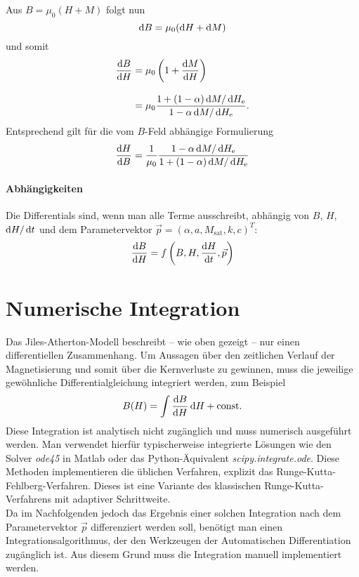 \documentclass{scrartcl}
\newcommand{\He}{H_\text{e}}
\newcommand{\Msat}{M_\text{sat}}
\begin{document}
Aus $B = \mu_0(H + M)$ folgt nun
\begin{equation}
	\mathop{}\!\mathrm{d} B = \mu_0 (\mathop{}\!\mathrm{d} H + \mathop{}\!\mathrm{d} M)
\end{equation}
und somit
\begin{equation}
\begin{aligned}
	\frac{\dif B}{\dif H} &= \mu_0 \left(1 + \frac{\dif M}{\dif H}\right)\\[0.3cm]
	&= \mu_0 \frac{1 + (1-\alpha)\dif M/\dif \He}{1 - \alpha \dif M/\dif \He}. \label{eq:dB_dH}
\end{aligned}
\end{equation}\vspace{0.3cm}
Entsprechend gilt für die vom $B$-Feld abhängige Formulierung
\begin{equation}
	\frac{\dif H}{\dif B} = \frac{1}{\mu_0} \frac{1 - \alpha \dif M/\dif \He}{1 + (1-\alpha)\dif M/\dif \He}
\end{equation}
\paragraph{Abhängigkeiten}
Die Differentials sind, wenn man alle Terme ausschreibt, abhängig von $B$, $H$, $\mathop{}\!\mathrm{d} H/\mathop{}\!\mathrm{d} t$ und dem Parametervektor $\vec{p} = (\alpha, a, \Msat, k, c)^T$:
\begin{equation}
	\frac{\mathop{}\!\mathrm{d} B}{\mathop{}\!\mathrm{d} H} = f\left(B, H, \frac{\mathop{}\!\mathrm{d} H}{\mathop{}\!\mathrm{d} t}, \vec p \right)
\end{equation}
\section{Numerische Integration}
\label{sec:numeric-integration}
Das Jiles-Atherton-Modell beschreibt -- wie oben gezeigt -- nur einen differentiellen Zusammenhang. Um Aussagen über den zeitlichen Verlauf der Magnetisierung und somit über die Kernverluste zu gewinnen, muss die jeweilige gewöhnliche Differentialgleichung integriert werden, zum Beispiel
\begin{equation}
B(H) = \int \frac{\mathop{}\!\mathrm{d} B}{\mathop{}\!\mathrm{d} H}\mathop{}\!\mathrm{d} H + \text{const.}
\end{equation}
Diese Integration ist analytisch nicht zugänglich und muss numerisch ausgeführt werden. Man verwendet hierfür typischerweise integrierte Lösungen wie den Solver \emph{ode45} in Matlab oder das Python-Äquivalent \emph{scipy.integrate.ode}. Diese Methoden implementieren die üblichen Verfahren, explizit das Runge-Kutta-Fehlberg-Verfahren. Dieses ist eine Variante des klassischen Runge-Kutta-Verfahrens mit adaptiver Schrittweite.\\
Da im Nachfolgenden jedoch das Ergebnis einer solchen Integration nach dem Parametervektor $\vec p$ differenziert werden soll, benötigt man einen Integrationsalgorithmus, der den Werkzeugen der Automatischen Differentiation zugänglich ist. Aus diesem Grund muss die Integration manuell implementiert werden.
\end{document}
